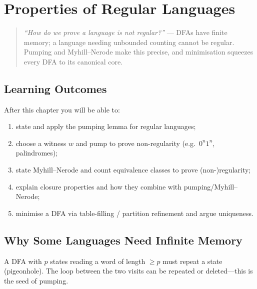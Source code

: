 \chapter{Properties of Regular Languages}
\label{ch:regular-properties}

\begin{quote}
\emph{``How do we prove a language is \emph{not} regular?''} --- DFAs have finite memory; a language needing unbounded counting cannot be regular. Pumping and Myhill--Nerode make this precise, and minimisation squeezes every DFA to its canonical core.
\end{quote}

\noindent{}
\vspace{0.4em}

\section*{Learning Outcomes}
After this chapter you will be able to:
\begin{enumerate}[label=(L\arabic*)]
    \item state and apply the pumping lemma for regular languages;
    \item choose a witness $w$ and pump to prove non-regularity (e.g.\ $0^n1^n$, palindromes);
    \item state Myhill--Nerode and count equivalence classes to prove (non-)regularity;
    \item explain closure properties and how they combine with pumping/Myhill--Nerode;
    \item minimise a DFA via table-filling / partition refinement and argue uniqueness.
\end{enumerate}

\section{Why Some Languages Need Infinite Memory}
\label{sec:why-nonregular}
A DFA with $p$ states reading a word of length $\ge p$ must repeat a state (pigeonhole). The loop between the two visits can be repeated or deleted---this is the seed of pumping.

